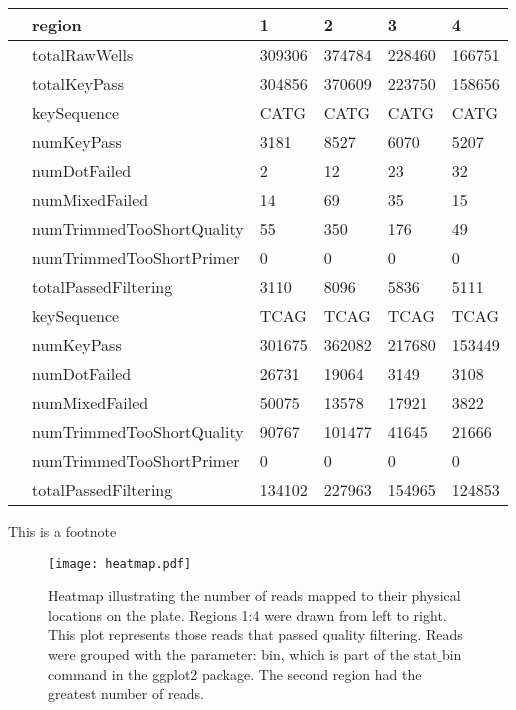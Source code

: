 \documentclass{bioinfo}
\begin{document}
\begin{methods}
\begin{table}[!t]
{\begin{tabular}{llllll}
  \hline
 & region & 1 & 2 & 3 & 4 & \\ 
  \hline
 
  & totalRawWells & 309306 & 374784 & 228460 & 166751 \\ 
  & totalKeyPass & 304856 & 370609 & 223750 & 158656 \\ 
  & keySequence & CATG & CATG & CATG & CATG \\ 
  & numKeyPass & 3181 & 8527 & 6070 & 5207 \\ 
  & numDotFailed & 2 & 12 & 23 & 32 \\ 
  & numMixedFailed & 14 & 69 & 35 & 15 \\ 
  & numTrimmedTooShortQuality & 55 & 350 & 176 & 49 \\ 
  & numTrimmedTooShortPrimer & 0 & 0 & 0 & 0 \\ 
  & totalPassedFiltering & 3110 & 8096 & 5836 & 5111 \\ 
  & keySequence & TCAG & TCAG & TCAG & TCAG \\ 
  & numKeyPass & 301675 & 362082 & 217680 & 153449 \\ 
  & numDotFailed & 26731 & 19064 & 3149 & 3108 \\ 
  & numMixedFailed & 50075 & 13578 & 17921 & 3822 \\ 
  & numTrimmedTooShortQuality & 90767 & 101477 & 41645 & 21666 \\ 
  & numTrimmedTooShortPrimer & 0 & 0 & 0 & 0 \\ 
  & totalPassedFiltering & 134102 & 227963 & 154965 & 124853 \\ 
   \hline

\end{tabular}}{This is a footnote}
\end{table}

\end{methods}

\begin{figure}[!tpb]
\centerline{\texttt{[image: heatmap.pdf]}}
\caption{Heatmap illustrating the number of reads mapped to their physical locations on the plate. Regions 1:4 were drawn from left to right. This plot represents those reads that passed quality filtering.  Reads were grouped with the parameter: bin, which is part of the stat$\_$bin command in the ggplot2 package.  The second region had the greatest number of reads.  }
\end{figure}
\end{document}
